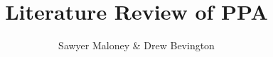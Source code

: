 \documentclass[10pt]{article}
\theoremstyle{definition}
\theoremstyle{remark}
\theoremstyle{definition}
\begin{document}
  

\author{Sawyer Maloney & Drew Bevington}
\title{Literature Review of PPA}
\date{}
\maketitle

\pagestyle{empty}   %
\thispagestyle{empty}
\end{document}
